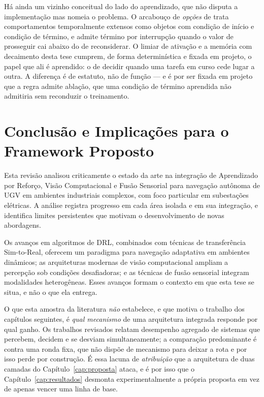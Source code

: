 Há ainda um vizinho conceitual do lado do aprendizado, que não disputa a implementação
mas nomeia o problema. O arcabouço de \emph{opções} de 
trata comportamentos temporalmente extensos como objetos com condição de início e
condição de término, e admite término por interrupção quando o valor de prosseguir cai
abaixo do de reconsiderar. O limiar de ativação e a memória com decaimento desta tese
cumprem, de forma determinística e fixada em projeto, o papel que ali é aprendido: o de
decidir quando uma tarefa em curso cede lugar a outra. A diferença é de estatuto, não de
função --- e é por ser fixada em projeto que a regra admite ablação, que uma condição de
término aprendida não admitiria sem reconduzir o treinamento.

\section{Conclusão e Implicações para o Framework Proposto}

Esta revisão analisou criticamente o estado da arte na integração de Aprendizado por Reforço, Visão Computacional e Fusão Sensorial para navegação autônoma de \ac{UGV} em ambientes industriais complexos, com foco particular em subestações elétricas. A análise registra progresso em cada área isolada e em sua integração, e identifica limites persistentes que motivam o desenvolvimento de novas abordagens.

Os avanços em algoritmos de \ac{DRL}, combinados com técnicas de transferência
Sim-to-Real, oferecem um paradigma para navegação adaptativa em ambientes dinâmicos; as
arquiteturas modernas de visão computacional ampliam a percepção sob condições
desafiadoras; e as técnicas de fusão sensorial integram modalidades heterogêneas. Esses
avanços formam o contexto em que esta tese se situa, e não o que ela entrega.

O que esta amostra da literatura \emph{não} estabelece, e que motiva o trabalho dos
capítulos seguintes, é \emph{qual mecanismo} de uma arquitetura integrada responde por
qual ganho. Os trabalhos revisados relatam desempenho agregado de sistemas que
percebem, decidem e se desviam simultaneamente; a comparação predominante é contra uma
ronda fixa, que não dispõe de mecanismo para deixar a rota e por isso perde por
construção. É essa lacuna de \emph{atribuição} que a arquitetura de duas camadas do
Capítulo~\ref{cap:proposta} ataca, e é por isso que o Capítulo~\ref{cap:resultados}
desmonta experimentalmente a própria proposta em vez de apenas vencer uma linha de
base.

